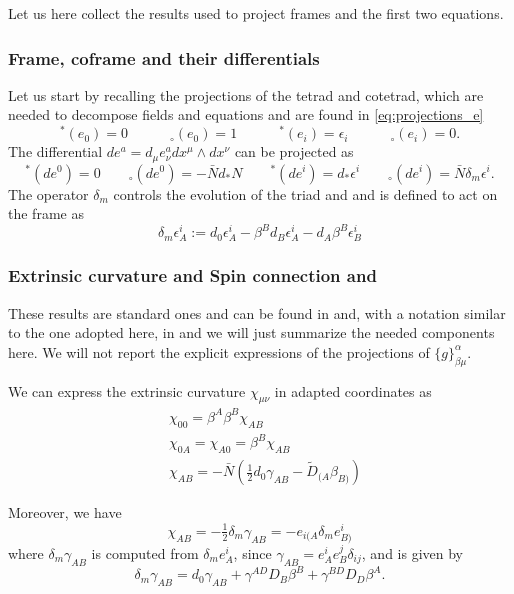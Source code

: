 \documentclass[a4paper, 11pt]{article}
\def\al{\alpha}
\def\be{\beta}
\def\ga{\gamma}
\def\de{\delta}
\def\ep{\epsilon}
\def\we{\wedge}
\def\tp#1{{}^\ast\!#1}
\def\np#1{{}_\circ#1}
\def\chr#1#2#3#4{\{#1\}^#2_{#3 #4}}
\numberwithin{equation}{section}
\begin{document}
Let us here collect the results used to project frames and the first two equations.

\subsubsection{Frame, coframe and their differentials}
Let us start by recalling the projections of the tetrad and cotetrad, which are needed to decompose fields and equations and are found in \eqref{eq:projections_e}
\begin{equation*}
    \tp(e_0) = 0 \quad\qquad \np(e_0) = 1  \quad\qquad \tp (e_i) = \ep_i \quad\qquad  \np(e_i)  = 0.
\end{equation*}
The differential $de^a = d_\mu e^a_\nu dx^\mu \we dx^\nu$ can be projected as 
   \begin{equation}
     \tp(de^0) = 0 \qquad \np(de^0) = - \bar N d_\ast N  \qquad \tp(de^i) = d_\ast \ep^i \qquad  \np(de^i) = \bar N \de_m \ep^i.
   \end{equation}
The operator $\de_m$ controls the evolution of the triad and and is defined to act on the frame as 
\begin{equation}
    \de_m \ep^i_A := d_0\ep^i_A - \be^B d_B \ep^i_A - d_A\be^B\ep^i_B
\end{equation} 

\subsubsection{Extrinsic curvature and Spin connection and}
These results are standard ones and can be found in \cite{gourgoulhon} and, with a notation similar to the one adopted here, in \cite{BookFatibene}  and we will just summarize the needed components here. We will not report the explicit expressions of the projections of $\chr g \al\be\mu$. 

We can express the extrinsic curvature $\chi_{\mu\nu}$ in adapted coordinates as 
\begin{equation}
    \begin{aligned}    
        & \chi_{00} = \be^A\be^B\chi_{AB} \\ 
        & \chi_{0A} = \chi_{A0} = \be^B\chi_{AB} \\
        &\chi_{AB} = - \bar N \left(\tfrac 1 2 d_0 \ga_{AB}- \tilde D_{(A}\be_{B)}\right)
    \end{aligned}
\end{equation}

Moreover, we have
\begin{equation}
 \chi_{AB} = -\tfrac 1 2 \de_m \ga_{AB} = -e_{i(A} \de_m e_{B)}^i 
 \label{eq:extrinsic_curvature_triad}
\end{equation}
where $\de_m\ga_{AB}$ is computed from $\de_m e^i_A$, since $\ga_{AB} = e^i_A e^j_B \de_{ij}$, and is given by
\begin{equation}
    \de_m \ga_{AB} = d_0 \ga_{AB} + \ga^{AD}D_B\be^B + \ga^{BD}D_D\be^A.
    \label{eq:de_m_metric}
\end{equation}
\end{document}
